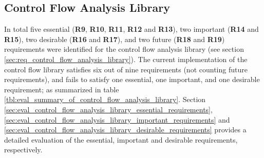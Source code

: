 
\subsection{Control Flow Analysis Library}
\label{sec:eval_control_flow_analysis_library}

In total five essential (\textbf{R9}, \textbf{R10}, \textbf{R11}, \textbf{R12} and \textbf{R13}), two important (\textbf{R14} and \textbf{R15}), two desirable (\textbf{R16} and \textbf{R17}), and two future (\textbf{R18} and \textbf{R19}) requirements were identified for the control flow analysis library (see section \ref{sec:req_control_flow_analysis_library}). The current implementation of the control flow library satisfies six out of nine requirements (not counting future requirements), and fails to satisfy one essential, one important, and one desirable requirement; as summarized in table \ref{tbl:eval_summary_of_control_flow_analysis_library}. Section \ref{sec:eval_control_flow_analysis_library_essential_requirements}, \ref{sec:eval_control_flow_analysis_library_important_requirements} and \ref{sec:eval_control_flow_analysis_library_desirable_requirements} provides a detailed evaluation of the essential, important and desirable requirements, respectively.




